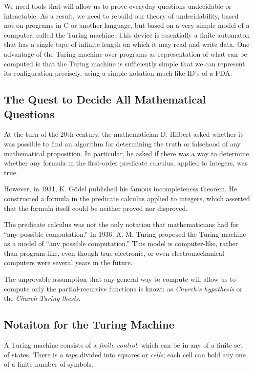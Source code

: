 \documentclass[]{article}
\begin{document}
  We need tools that will allow us to prove everyday questions undecidable or
  intractable. As a result, we need to rebuild our theory of undecidability,
  based not on programs in C or another language, but based on a very simple 
  model of a computer, called the Turing machine. This device is essentially a 
  finite automaton that has a single tape of infinite length on which it may 
  read and write data. One advantage of the Turing machine over programs as 
  representation of what can be computed is that the Turing machine is 
  sufficiently simple that we can represent its configuration precisely, using 
  a simple notation much like ID's of a PDA.
    
  \subsection*{The Quest to Decide All Mathematical Questions}
    At the turn of the 20th century, the mathematician D. Hilbert asked whether 
    it was possible to find an algorithm for determining the truth or falsehood 
    of any mathematical proposition. In particular, he asked if there was a way 
    to determine whether any formula in the first-order predicate calculus, 
    applied to integers, was true.
    
    However, in 1931, K. G\"odel published his famous incompleteness theorem. 
    He constructed a formula in the predicate calculus applied to integers, 
    which asserted that the formula itself could be neither proved nor 
    disproved.
    
    The predicate calculus was not the only notation that mathematicians had 
    for ``any possible computation.'' In 1936, A. M. Turing proposed the Turing 
    machine as a model of ``any possible computation.'' This model is 
    computer-like, rather than program-like, even though true electronic, or 
    even electromechanical computers were several years in the future.
    
    The unprovable assumption that any general way to compute will allow us to
    compute only the partial-recursive functions is known as 
    \emph{Church's hypothesis} or the \emph{Church-Turing thesis}.
    
  \subsection*{Notaiton for the Turing Machine}
    A Turing machine consists of a \emph{finite control}, which can be in any 
    of a finite set of states. There is a \emph{tape} divided into squares or
    \emph{cells}; each cell can hold any one of a finite number of symbols.
    
\end{document}
